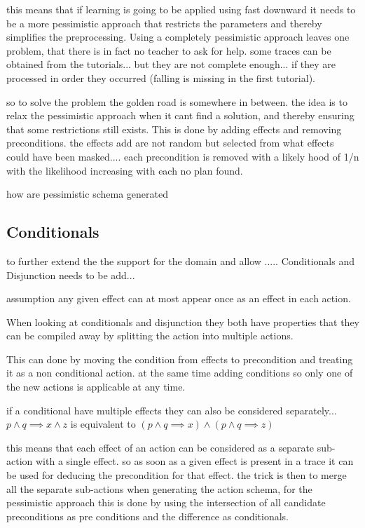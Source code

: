 this means that if learning is going to be applied using fast downward it needs to be a more pessimistic approach that restricts the parameters and thereby simplifies the preprocessing. Using a completely pessimistic approach leaves one problem, that there is in fact no teacher to ask for help. some traces can be obtained from the tutorials... but they are not complete enough... if they are processed in order they occurred (falling is missing in the first tutorial).  

so to solve the problem the golden road is somewhere in between. the idea is to relax the pessimistic approach when it cant find a solution, and thereby ensuring that some restrictions still exists. This is done by adding effects and removing preconditions. the effects add are not random but selected from what effects could have been masked.... each precondition is removed with a likely hood of 1/n with the likelihood increasing with each no plan found.

how are pessimistic schema generated

\subsection{Conditionals}	

	to further extend the the support for the domain and allow ..... Conditionals and Disjunction needs to be add...

	assumption any given effect can at most appear once as an effect in each action.

	When looking at conditionals and disjunction they both have properties that they can be compiled away by splitting the action into multiple actions. %
	
	
	This can done by moving the condition from effects to precondition and treating it as a non conditional action. at the same time adding conditions so only one of the new actions is applicable at any time.
	
	if a conditional have multiple effects they can also be considered separately...
	$p \land q \implies x \land z$
	is equivalent to 
	$(p \land q \implies x)
	\land
	(p \land q \implies z)$
	
	
	this means that each effect of an action can be considered as a separate sub-action with a single effect. so as soon as a given effect is present in a trace it can be used for deducing the precondition for that effect. the trick is then to merge all the separate sub-actions when generating the action schema, for the pessimistic approach this is done by using the intersection of all candidate preconditions as pre conditions and the difference as conditionals.

